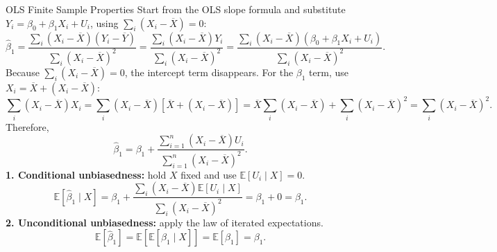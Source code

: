 \documentclass[notes,10pt, aspectratio=169]{beamer}
\begin{document}
\begin{frame}{OLS Finite Sample Properties}
\footnotesize
\setlength{\abovedisplayskip}{3pt}
\setlength{\belowdisplayskip}{3pt}
Start from the OLS slope formula and substitute
$Y_i=\beta_0+\beta_1X_i+U_i$, using $\sum_i(X_i-\overline X)=0$:
\[
\hat{\beta}_1
=\frac{\sum_i(X_i-\overline X)(Y_i-\overline Y)}{\sum_i(X_i-\overline X)^2}
=\frac{\sum_i(X_i-\overline X)Y_i}{\sum_i(X_i-\overline X)^2}
=\frac{\sum_i(X_i-\overline X)(\beta_0+\beta_1X_i+U_i)}
        {\sum_i(X_i-\overline X)^2}.
\]
Because $\sum_i(X_i-\overline X)=0$, the intercept term disappears. For the
$\beta_1$ term, use $X_i=\overline X+(X_i-\overline X)$:
\[
\sum_i(X_i-\overline X)X_i
=\sum_i(X_i-\overline X)\left[\overline X+(X_i-\overline X)\right]
=\overline X\sum_i(X_i-\overline X)+\sum_i(X_i-\overline X)^2
=\sum_i(X_i-\overline X)^2.
\]
Therefore,
\[
\hat{\beta}_1=\beta_1+
\frac{\sum_{i=1}^n(X_i-\overline X)U_i}
     {\sum_{i=1}^n(X_i-\overline X)^2}.
\]
\textbf{1. Conditional unbiasedness:} hold $X$ fixed and use $\mathbb{E}[U_i\mid X]=0$.
\[
\mathbb{E}[\hat\beta_1\mid X]
=\beta_1+
\frac{\sum_i(X_i-\overline X)\mathbb{E}[U_i\mid X]}
{\sum_i(X_i-\overline X)^2}
=\beta_1+0=\boxed{\beta_1}.
\]
\textbf{2. Unconditional unbiasedness:} apply the law of iterated expectations.
\[
\mathbb{E}[\hat\beta_1]
=\mathbb{E}\!\left[\mathbb{E}[\hat\beta_1\mid X]\right]
=\mathbb{E}[\beta_1]=\boxed{\beta_1}.
\]
\end{frame}
\end{document}
